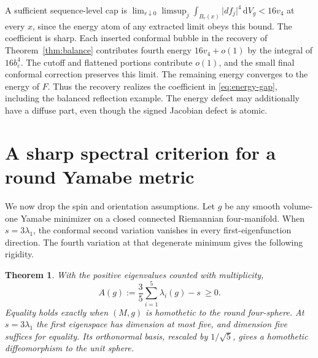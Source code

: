 \documentclass[11pt]{article}
\numberwithin{equation}{section}
\newtheorem{theorem}{Theorem}[section]
\newcommand{\dd}{\mathrm{d}}
\newcommand{\e}{\varepsilon}
\newcommand{\abs}[1]{\lvert #1\rvert}
\newcommand{\dv}{\dd V_g}
\begin{document}
A sufficient sequence-level cap is
\(\lim_{r\downarrow0}\limsup_j\int_{B_r(x)}\abs{df_j}^4\,\dv<16v_4\)
at every \(x\), since the energy atom of any extracted limit
obeys this bound. The coefficient is sharp. Each inserted conformal bubble
in the recovery of Theorem~\ref{thm:balance} contributes fourth
energy \(16v_4+o(1)\) by the integral of \(16b_\e^4\).
The cutoff and flattened portions contribute \(o(1)\), and the
small final conformal correction preserves this limit. The
remaining energy converges to the energy of \(F\). Thus the
recovery realizes the coefficient in \eqref{eq:energy-gap},
including the balanced reflection example. The energy defect
may additionally have a diffuse part, even though the signed
Jacobian defect is atomic.

\section{A sharp spectral criterion for a round Yamabe metric}\label{sec:rigidity}

We now drop the spin and orientation assumptions. Let \(g\) be any
smooth volume-one Yamabe minimizer on a closed connected Riemannian
four-manifold. When \(s=3\lambda_1\), the conformal second variation
vanishes in every first-eigenfunction direction. The fourth variation
at that degenerate minimum gives the following rigidity.

\begin{theorem}\label{thm:spectral}
With the positive eigenvalues counted with multiplicity,
\[
 A(g):=\frac35\sum_{i=1}^5\lambda_i(g)-s\ \ge 0 .
\]
Equality holds exactly when \((M,g)\) is homothetic to the round
four-sphere. At \(s=3\lambda_1\) the first eigenspace has dimension at
most five, and dimension five suffices for equality. Its orthonormal
basis, rescaled by \(1/\sqrt{5}\), gives a homothetic diffeomorphism to
the unit sphere.
\end{theorem}
\end{document}
